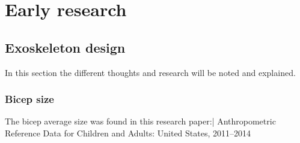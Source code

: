 \chapter{Early research} \label{chap:research}

\section{Exoskeleton design}
In this section the different thoughts and research will be noted and explained. 

\subsection{Bicep size}
The bicep average size was found in this research paper:| Anthropometric Reference Data for Children and Adults: United States, 2011–2014


